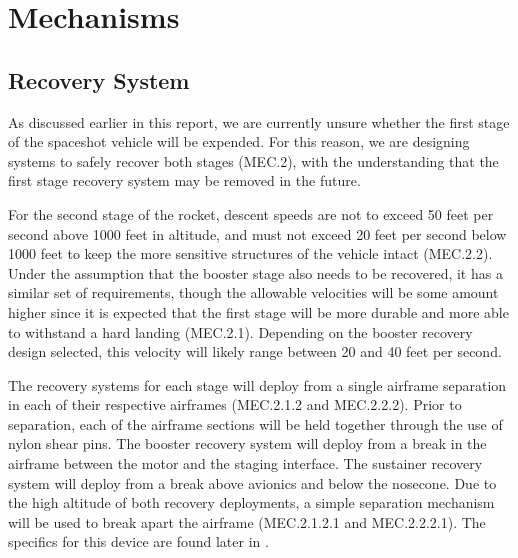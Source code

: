 \section{Mechanisms} \label{section:mechanisms}
\subsection{Recovery System}  %

As discussed earlier in this report, we are currently unsure whether the first stage of the space\-shot vehicle will be expended. For this reason, we are designing systems to safely recover both stages (MEC.2), with the understanding that the first stage recovery system may be removed in the future.

For the second stage of the rocket, descent speeds are not to exceed 50 feet per second above 1000 feet in altitude, and must not exceed 20 feet per second below 1000 feet to keep the more sensitive structures of the vehicle intact (MEC.2.2). Under the assumption that the booster stage also needs to be recovered, it has a similar set of requirements, though the allowable velocities will be some amount higher since it is expected that the first stage will be more durable and more able to withstand a hard landing (MEC.2.1). Depending on the booster recovery design selected, this velocity will likely range between 20 and 40 feet per second.

The recovery systems for each stage will deploy from a single airframe separation in each of their respective airframes (MEC.2.1.2 and MEC.2.2.2). Prior to separation, each of the airframe sections will be held together through the use of nylon shear pins. The booster recovery system will deploy from a break in the airframe between the motor and the staging interface. The sustainer recovery system will deploy from a break above avionics and below the nosecone. Due to the high altitude of both recovery deployments, a simple separation mechanism will be used to break apart the airframe (MEC.2.1.2.1 and MEC.2.2.2.1). The specifics for this device are found later in .

